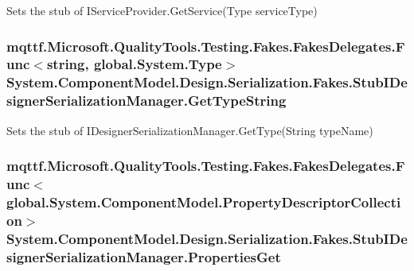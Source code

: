 Sets the stub of I\-Service\-Provider.\-Get\-Service(\-Type service\-Type)

\hypertarget{class_system_1_1_component_model_1_1_design_1_1_serialization_1_1_fakes_1_1_stub_i_designer_serialization_manager_a3dc15092c45178af6d8335899b922515}{
\subsubsection[{Get\-Type\-String}]{\setlength{\rightskip}{0pt plus 5cm}mqttf.\-Microsoft.\-Quality\-Tools.\-Testing.\-Fakes.\-Fakes\-Delegates.\-Func$<$string, global.\-System.\-Type$>$ System.\-Component\-Model.\-Design.\-Serialization.\-Fakes.\-Stub\-I\-Designer\-Serialization\-Manager.\-Get\-Type\-String}}\label{class_system_1_1_component_model_1_1_design_1_1_serialization_1_1_fakes_1_1_stub_i_designer_serialization_manager_a3dc15092c45178af6d8335899b922515}


Sets the stub of I\-Designer\-Serialization\-Manager.\-Get\-Type(\-String type\-Name)

\hypertarget{class_system_1_1_component_model_1_1_design_1_1_serialization_1_1_fakes_1_1_stub_i_designer_serialization_manager_aac566d73bd7e66d8cda39f51119ee71b}{
\subsubsection[{Properties\-Get}]{\setlength{\rightskip}{0pt plus 5cm}mqttf.\-Microsoft.\-Quality\-Tools.\-Testing.\-Fakes.\-Fakes\-Delegates.\-Func$<$global.\-System.\-Component\-Model.\-Property\-Descriptor\-Collection$>$ System.\-Component\-Model.\-Design.\-Serialization.\-Fakes.\-Stub\-I\-Designer\-Serialization\-Manager.\-Properties\-Get}}\label{class_system_1_1_component_model_1_1_design_1_1_serialization_1_1_fakes_1_1_stub_i_designer_serialization_manager_aac566d73bd7e66d8cda39f51119ee71b}


